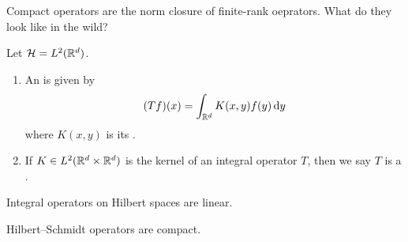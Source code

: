 
\lecture{}

\begin{node}
Compact operators are the norm closure of finite-rank oeprators. What
do they look like in the wild?
\end{node}

\begin{definition}
Let $\mathcal{H}=L^{2}(\mathbb{R}^{d})$.
\begin{enumerate}
\item An  is given by
  \begin{equation*}
(Tf)(x)=\int_{\mathbb{R}^{d}}K(x,y)f(y)\,\mathrm{d} y
  \end{equation*}
  where $K(x,y)$ is its .
\item If $K\in L^{2}(\mathbb{R}^{d}\times\mathbb{R}^{d})$ is the kernel of an
  integral operator $T$, then we say $T$ is a .
\end{enumerate}
\end{definition}

\begin{fact}
Integral operators on Hilbert spaces are linear.
\end{fact}

\begin{proposition}
Hilbert--Schmidt operators are compact.
\end{proposition}

